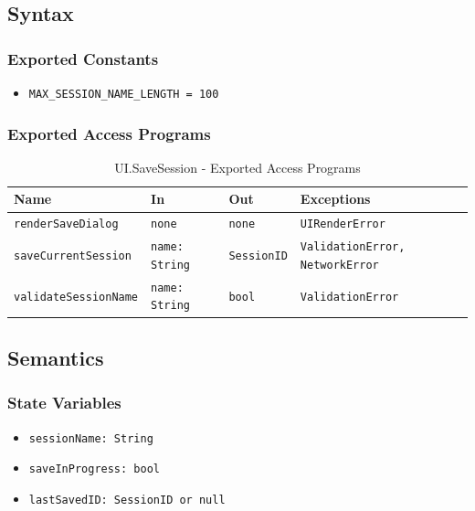 \documentclass[12pt, titlepage]{article}
\begin{document}
\subsection{Syntax}

\subsubsection{Exported Constants}
\begin{itemize}
    \item \texttt{MAX\_SESSION\_NAME\_LENGTH = 100}
\end{itemize}

\subsubsection{Exported Access Programs}

\begin{table}[H]
\centering
\small
\caption{UI.SaveSession - Exported Access Programs}
\begin{tabular}{p{3.5cm} p{3.2cm} p{3.2cm} p{4.1cm}}
\toprule
\textbf{Name} & \textbf{In} & \textbf{Out} & \textbf{Exceptions} \\
\midrule
\texttt{renderSaveDialog} & \texttt{none} & \texttt{none} & \texttt{UIRenderError} \\
\texttt{saveCurrentSession} & \texttt{name: String} & \texttt{SessionID} & \texttt{ValidationError, NetworkError} \\
\texttt{validateSessionName} & \texttt{name: String} & \texttt{bool} & \texttt{ValidationError} \\
\bottomrule
\end{tabular}
\end{table}

\subsection{Semantics}

\subsubsection{State Variables}
\begin{itemize}
    \item \texttt{sessionName: String}
    \item \texttt{saveInProgress: bool}
    \item \texttt{lastSavedID: SessionID or null}
\end{itemize}
\end{document}
